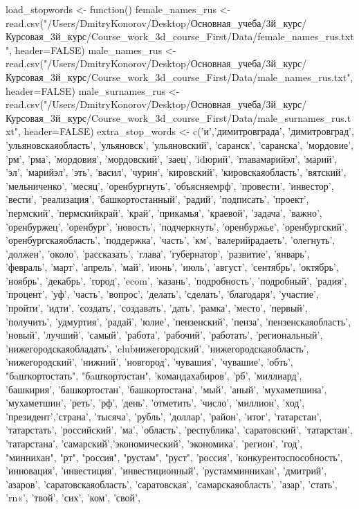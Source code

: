 load_stopwords <- function() {
  female_names_rus <- read.csv("/Users/DmitryKonorov/Desktop/Основная_учеба/3й_курс/Курсовая_3й_курс/Course_work_3d_course_First/Data/female_names_rus.txt", header=FALSE)
  male_names_rus <- read.csv("/Users/DmitryKonorov/Desktop/Основная_учеба/3й_курс/Курсовая_3й_курс/Course_work_3d_course_First/Data/male_names_rus.txt", header=FALSE)
  male_surnames_rus <- read.csv("/Users/DmitryKonorov/Desktop/Основная_учеба/3й_курс/Курсовая_3й_курс/Course_work_3d_course_First/Data/male_surnames_rus.txt", header=FALSE)
  extra_stop_words <- c('и','димитровграда', 'димитровград', 'ульяновскаяобласть', 'ульяновск', 'ульяновский', 'саранск', 'саранска', 'мордовие', 'рм', 'рма', 'мордовия', 'мордовский', 'заец', 'idюрий', 'главамарийэл', 'марий', 'эл', 'марийэл', 'эть', 'васил', 'чурин', 'кировский', 'кировскаяобласть', 'вятский', 'мельниченко', 'месяц', 'оренбургнуть', 'объясняемрф', 'провести', 'инвестор', 'вести', 'реализация', 'башкортостанный', 'радий', 'подписать', 'проект', 'пермский', 'пермскийкрай', 'край', 'прикамья', 'краевой', 'задача', 'важно', 'оренбуржец', 'оренбург', 'новость', 'подчеркнуть', 'оренбуржье', 'оренбургский', 'оренбургскаяобласть', 'поддержка', 'часть', 'км', 'валерийрадаеть', 'олегнуть', 'должен', 'около', 'рассказать', 'глава', 'губернатор', 'развитие', 'январь', 'февраль', 'март', 'апрель', 'май', 'июнь', 'июль', 'август', 'сентябрь', 'октябрь', 'ноябрь', 'декабрь', 'город', 'ecom', 'казань', 'подробность', 'подробный', 'радия', 'процент', 'уф', 'часть', 'вопрос', 'делать', 'сделать', 'благодаря', 'участие', 'пройти', 'идти', 'создать', 'создавать', 'дать',  'рамка', 'место', 'первый', 'получить', 'удмуртия', 'радай', 'юлие', 'пензенский', 'пенза', 'пензенскаяобласть', 'новый', 'лучший', 'самый', 'работа', 'рабочий', 'работать', 'региональный', 'нижегородскаяобладать', 'clubнижегородский', 'нижегородскаяобласть', 'нижегородский', 'нижний', 'новгород', 'чувашия', 'чувашие', 'обть', "бaшҡортостать", "бaшҡортостан", 'командахабиров', 'рб', 'миллиард', 'башкирия', 'башкортостан', 'башкортостана', 'мый', 'аный', 'мухаметшина', 'мухаметшин', 'реть', 'рф', 'день', 'отметить', 'число', 'миллион', 'ход', 'президент','страна', 'тысяча', 'рубль', 'доллар', 'район', 'итог', 'татарстан', 'татарстать', 'российский', 'ма', 'область', 'республика', 'саратовский', 'татарстан', 'татарстана', 'самарский','экономический', 'экономика', 'регион', 'год', "миннихан", "рт", "россия", "рустам", "руст", 'россия', 'конкурентоспособность', 'инновация', 'инвестиция', 'инвестиционный', 'рустамминнихан', 'дмитрий', 'азаров', 'саратовскаяобласть', 'саратовская', 'самарскаяобласть', 'азар', 'стать', 'rn«', 'твой', 'сих', 'ком', 'свой',
}
